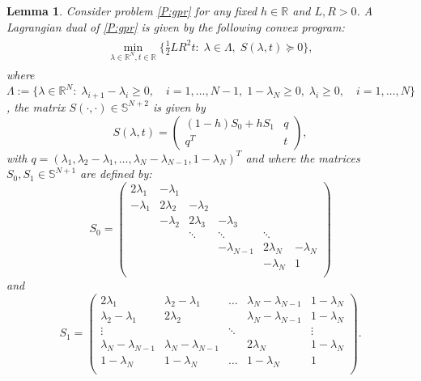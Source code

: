 \documentclass[12pt]{article}
\numberwithin{equation}{section}
\newtheorem{lemma}{Lemma}[section]
\theoremstyle{definition}
\theoremstyle{remark}
\def\real{\mathbb{R}}
\begin{document}
\begin{lemma}\label{lem:dual} Consider problem \eqref{P:gpr} for any fixed $h\in \real$ and  $L,R >0$.
A Lagrangian dual of \eqref{P:gpr} is given by the following convex program:
\begin{align*}
    \begin{aligned}
        \min_{\lambda \in \real^N, t \in \real}\{\frac{1}{2} LR^2 t:\; \lambda \in \Lambda, \; S(\lambda, t) \succeq 0 \},
    \end{aligned}
    \tag{DG$^\prime$}\label{P:dualgpr}
\end{align*}
where $\Lambda:=\{\lambda \in \real^N:\; \lambda_{i+1}-\lambda_i \geq 0, \quad
i=1,\dots,N-1,\; 1-\lambda_N \geq 0,\; \lambda_i \geq 0,\quad i=1,\dots,N\}$,
the matrix
$S(\cdot,\cdot)\in \mathbb{S}^{N+2}$ is given by \[
    S(\lambda,t)=\begin{pmatrix}
                (1-h)S_0 + h S_1    & q \\
                q^T     & t
        \end{pmatrix},
\]
with $q=(\lambda_1,\lambda_2-\lambda_1,\dots,\lambda_N-\lambda_{N-1},1-\lambda_N)^T$ and where
the matrices $S_0, S_1\in \mathbb{S}^{N+1}$ are  defined by: {\small
\begin{equation}\label{b0matrix}
    S_0=
    \begin{pmatrix}
        2 \lambda_1     & -\lambda_1            \\
        -\lambda_1          & 2 \lambda_2   & -\lambda_2                \\
            &       -\lambda_2          & 2 \lambda_3   & -\lambda_3                \\
                                    &        & \ddots        &\ddots &   \ddots\\
                                            & &                 &       -\lambda_{N-1}  & 2 \lambda_N & -\lambda_N \\
                                            & &                 &        &  -\lambda_N  & 1\\
    \end{pmatrix}
\end{equation}
}
 and
{\small {\begin{equation}\label{b1matrix}
    S_1=
        \begin{pmatrix}
        2 \lambda_1         & \lambda_2-\lambda_1           &\dots          &\lambda_N-\lambda_{N-1}    &1-\lambda_N  \\
        \lambda_2-\lambda_1         & 2 \lambda_2                   &           &\lambda_N-\lambda_{N-1}    &1-\lambda_N \\

        \vdots & & \ddots & &\vdots \\
        \lambda_N-\lambda_{N-1}     & \lambda_N-\lambda_{N-1}   &       & 2\lambda_N    & 1-\lambda_N  \\
        1-\lambda_N         & 1-\lambda_N       & \dots         & 1-\lambda_N   & 1 \\
    \end{pmatrix}
    .
\end{equation}}}
\end{lemma}
\end{document}
